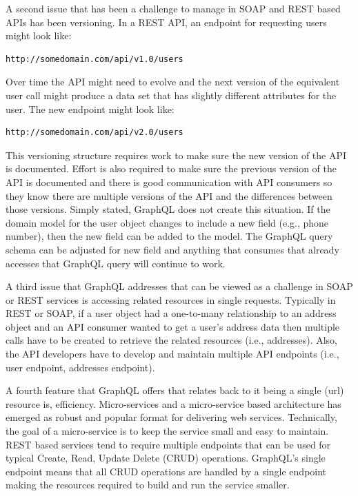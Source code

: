 A second issue that has been a challenge to manage in SOAP and REST based APIs
has been versioning.  In a REST API, an endpoint for requesting users might look
like:
\begin{verbatim}http://somedomain.com/api/v1.0/users \end{verbatim}
Over time the API might need to evolve and the next version of the equivalent
user call might produce a data set that has slightly different attributes for
the user. The new endpoint might look like:
\begin{verbatim}http://somedomain.com/api/v2.0/users \end{verbatim}
This versioning structure requires work to make sure the new version of the API
is documented.  Effort is also required to make sure the previous version of the
API is documented and there is good communication with API consumers so they
know there are multiple versions of the API and the differences between those
versions.  Simply stated, GraphQL does not create this situation.  If the domain
model for the user object changes to include a new field (e.g., phone number),
then the new field can be added to the model.  The GraphQL query schema can be
adjusted for new field and anything that consumes that already accesses that 
GraphQL query will continue to work.

A third issue that GraphQL addresses that can be viewed as a challenge in SOAP 
or REST services is accessing related resources in single requests\cite{hid505FacebookGraphQL2018}.  
Typically in REST or SOAP, if a user object had a one-to-many relationship to 
an address object and an API consumer wanted to get a user's address data then 
multiple calls have to be created to retrieve the related resources 
(i.e., addresses).  Also, the API developers have to develop and maintain 
multiple API endpoints (i.e., user endpoint, addresses endpoint).

A fourth feature that GraphQL offers that relates back to it being a single 
(url) resource is, efficiency.  Micro-services and a micro-service based 
architecture has emerged as robust and popular format for delivering web 
services.  Technically, the goal of a micro-service is to keep the service small 
and easy to maintain. REST based services tend to require multiple endpoints 
that can be used for typical Create, Read, Update Delete (CRUD) operations.  
GraphQL's single endpoint means that all CRUD operations are handled by a single 
endpoint making the resources required to build and run the service smaller.

